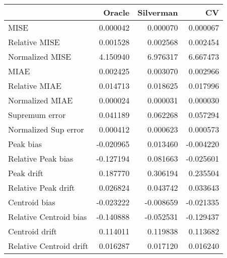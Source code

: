 \begin{tabular}{lrrr}
  \toprule
 & Oracle & Silverman & CV \\ 
  \midrule
MISE & 0.000042 & 0.000070 & 0.000067 \\ 
  Relative MISE & 0.001528 & 0.002568 & 0.002454 \\ 
  Normalized MISE & 4.150940 & 6.976317 & 6.667473 \\ 
  MIAE & 0.002425 & 0.003070 & 0.002966 \\ 
  Relative MIAE & 0.014713 & 0.018625 & 0.017996 \\ 
  Normalized MIAE & 0.000024 & 0.000031 & 0.000030 \\ 
  Supremum error & 0.041189 & 0.062268 & 0.057294 \\ 
  Normalized Sup error & 0.000412 & 0.000623 & 0.000573 \\ 
  Peak bias & -0.020965 & 0.013460 & -0.004220 \\ 
  Relative Peak bias & -0.127194 & 0.081663 & -0.025601 \\ 
  Peak drift & 0.187770 & 0.306194 & 0.235504 \\ 
  Relative Peak drift & 0.026824 & 0.043742 & 0.033643 \\ 
  Centroid bias & -0.023222 & -0.008659 & -0.021335 \\ 
  Relative Centroid bias & -0.140888 & -0.052531 & -0.129437 \\ 
  Centroid drift & 0.114011 & 0.119838 & 0.113682 \\ 
  Relative Centroid drift & 0.016287 & 0.017120 & 0.016240 \\ 
   \bottomrule
\end{tabular}
